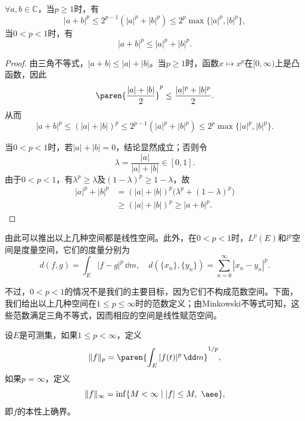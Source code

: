 \begin{lemma}
    $\forall a,b\in\mathbb{C}$，当$p\geq 1$时，有
    \begin{equation}
        |a+b|^p\leq 2^{p-1}(|a|^p+|b|^p)\leq 2^p\max\{|a|^p,|b|^p\},
    \end{equation}
    当$0<p<1$时，有
    \begin{equation}
        |a+b|^p\leq |a|^p+|b|^p.
    \end{equation}
\end{lemma}
\begin{proof}
    由三角不等式，$|a+b|\leq |a|+|b|$。当$p\geq 1$时，函数$x\mapsto x^p$在$[0,\infty)$上是凸函数，因此
    \begin{equation}
        \paren{\frac{|a|+|b|}{2}}^p\leq \frac{|a|^p+|b|^p}{2}.
    \end{equation}
    从而
    \begin{equation}
        |a+b|^p\leq (|a|+|b|)^p\leq 2^{p-1}(|a|^p+|b|^p)\leq 2^p\max\{|a|^p,|b|^p\}.
    \end{equation}

    当$0<p<1$时，若$|a|+|b|=0$，结论显然成立；否则令
    \begin{equation}
        \lambda=\frac{|a|}{|a|+|b|}\in[0,1].
    \end{equation}
    由于$0<p<1$，有$\lambda^p\geq\lambda$及$(1-\lambda)^p\geq 1-\lambda$，故
    \begin{align}
        |a|^p+|b|^p
        &=(|a|+|b|)^p\bigl(\lambda^p+(1-\lambda)^p\bigr)\nonumber\\
        &\geq (|a|+|b|)^p
        \geq |a+b|^p.
    \end{align}
\end{proof}

由此可以推出以上几种空间都是线性空间。此外，在$0<p<1$时，$L^p(E)$和$l^p$空间是度量空间，它们的度量分别为
\begin{equation}
    d(f,g)=\int_{E}|f-g|^p\,\dd m,\quad d(\{x_n\},\{y_n\})=\sum_{n=0}^{\infty}|x_n-y_n|^p.
\end{equation}

不过，$0<p<1$的情况不是我们的主要目标，因为它们不构成范数空间。下面，我们给出以上几种空间在$1\leq p \leq \infty$时的范数定义；由Minkowski不等式可知，这些范数满足三角不等式，因而相应的空间是线性赋范空间。

\begin{definition}[$L^p$空间的范数]
    设$E$是可测集，如果$1\leq p<\infty$，定义
    \begin{equation}
        \|f\|_p=\paren{\int_{E}|f(t)|^p\,\dd m}^{1/p},
    \end{equation}
    如果$p=\infty$，定义
    \begin{equation}
        \|f\|_{\infty}=\inf\{M<\infty \mid |f|\leq M,\ \aee\},
    \end{equation}
    即$f$的本性上确界。
\end{definition}


